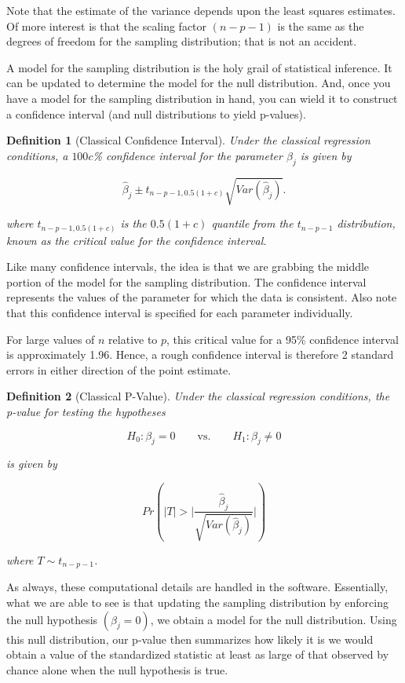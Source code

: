 \documentclass[
]{book}
\theoremstyle{plain}
\theoremstyle{mydefn}
\newtheorem{definition}{Definition}[chapter]
\theoremstyle{myexmpl}
\theoremstyle{remark}
\begin{document}
Note that the estimate of the variance depends upon the least squares estimates. Of more interest is that the scaling factor \((n - p - 1)\) is the same as the degrees of freedom for the sampling distribution; that is not an accident.

A model for the sampling distribution is the holy grail of statistical inference. It can be updated to determine the model for the null distribution. And, once you have a model for the sampling distribution in hand, you can wield it to construct a confidence interval (and null distributions to yield p-values).

\begin{definition}[Classical Confidence Interval]
Under the classical regression conditions, a \(100c\)\% confidence interval for the parameter \(\beta_j\) is given by

\[\widehat{\beta}_j \pm t_{n-p-1, 0.5(1+c)} \sqrt{Var\left(\widehat{\beta}_j\right)}.\]

where \(t_{n-p-1, 0.5(1+c)}\) is the \(0.5(1+c)\) quantile from the \(t_{n-p-1}\) distribution, known as the critical value for the confidence interval.
\end{definition}

Like many confidence intervals, the idea is that we are grabbing the middle portion of the model for the sampling distribution. The confidence interval represents the values of the parameter for which the data is consistent. Also note that this confidence interval is specified for each parameter individually.

For large values of \(n\) relative to \(p\), this critical value for a 95\% confidence interval is approximately 1.96. Hence, a rough confidence interval is therefore 2 standard errors in either direction of the point estimate.

\begin{definition}[Classical P-Value]
Under the classical regression conditions, the p-value for testing the hypotheses

\[H_0: \beta_j = 0 \qquad \text{vs.} \qquad H_1: \beta_j \neq 0\]

is given by

\[Pr\left(\lvert T\rvert > \lvert\frac{\widehat{\beta}_j}{\sqrt{Var\left(\widehat{\beta}_j\right)}}\rvert\right)\]

where \(T \sim t_{n-p-1}\).
\end{definition}

As always, these computational details are handled in the software. Essentially, what we are able to see is that updating the sampling distribution by enforcing the null hypothesis \(\left(\beta_j = 0\right)\), we obtain a model for the null distribution. Using this null distribution, our p-value then summarizes how likely it is we would obtain a value of the standardized statistic at least as large of that observed by chance alone when the null hypothesis is true.
\end{document}
